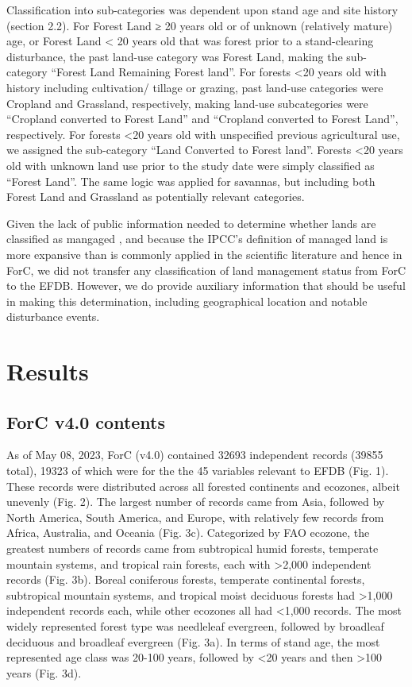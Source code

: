 \documentclass[, manuscript]{copernicus}
\begin{document}
Classification into sub-categories was dependent upon stand age and site
history (section 2.2). For Forest Land ≥ 20 years old or of unknown
(relatively mature) age, or Forest Land \textless{} 20 years old that
was forest prior to a stand-clearing disturbance, the past land-use
category was Forest Land, making the sub-category ``Forest Land
Remaining Forest land''. For forests \textless20 years old with history
including cultivation/ tillage or grazing, past land-use categories were
Cropland and Grassland, respectively, making land-use subcategories were
``Cropland converted to Forest Land'' and ``Cropland converted to Forest
Land'', respectively. For forests \textless20 years old with unspecified
previous agricultural use, we assigned the sub-category ``Land Converted
to Forest land''. Forests \textless20 years old with unknown land use
prior to the study date were simply classified as ``Forest Land''. The
same logic was applied for savannas, but including both Forest Land and
Grassland as potentially relevant categories.

Given the lack of public information needed to determine whether lands
are classified as mangaged
\citep{ogle_delineating_2018, deng_comparing_2021}, and because the
IPCC's definition of managed land is more expansive than is commonly
applied in the scientific literature and hence in ForC, we did not
transfer any classification of land management status from ForC to the
EFDB. However, we do provide auxiliary information that should be useful
in making this determination, including geographical location and
notable disturbance events.

\section{Results}

\subsection{ForC v4.0 contents}

As of May 08, 2023, ForC (v4.0) contained 32693 independent records
(39855 total), 19323 of which were for the the 45 variables relevant to
EFDB (Fig. 1). These records were distributed across all forested
continents and ecozones, albeit unevenly (Fig. 2). The largest number of
records came from Asia, followed by North America, South America, and
Europe, with relatively few records from Africa, Australia, and Oceania
(Fig. 3c). Categorized by FAO ecozone, the greatest numbers of records
came from subtropical humid forests, temperate mountain systems, and
tropical rain forests, each with \textgreater2,000 independent records
(Fig. 3b). Boreal coniferous forests, temperate continental forests,
subtropical mountain systems, and tropical moist deciduous forests had
\textgreater1,000 independent records each, while other ecozones all had
\textless1,000 records. The most widely represented forest type was
needleleaf evergreen, followed by broadleaf deciduous and broadleaf
evergreen (Fig. 3a). In terms of stand age, the most represented age
class was 20-100 years, followed by \textless20 years and then
\textgreater100 years (Fig. 3d).
\end{document}
